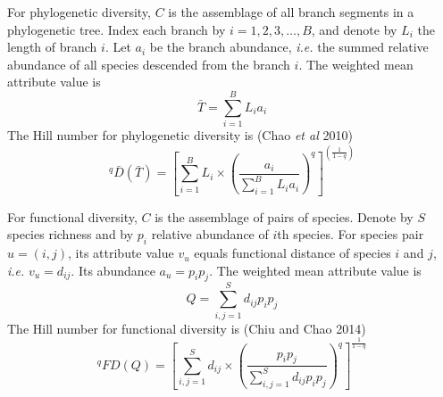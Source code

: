 \documentclass[11pt]{article}
\begin{document}
For phylogenetic diversity, $C$ is the assemblage of all branch segments in a phylogenetic tree. 
Index each branch by $i = 1,2,3,\dots,B$, and denote by $L_i$ the length of branch $i$. 
Let $a_i$ be the branch abundance, \textit{i.e.} the summed relative abundance of all species descended from the branch $i$. 
The weighted mean attribute value is 
\begin{equation}
    \bar{T} = \sum\limits_{i=1}^{B}L_ia_i
    \label{WeightedMeanAttributeValue_Phylogenetic}
\end{equation}
The Hill number for phylogenetic diversity is (Chao \textit{et al} 2010)
\begin{equation}
    ^{q}\bar{D}(\bar{T}) = [\sum\limits_{i=1}^{B}L_i \times (\frac{a_i}{\sum\limits_{i=1}^{B}L_ia_i})^q]^{(\frac{1}{1-q})}
    \label{HillNumber_Phylogenetic}
\end{equation}

\newline

For functional diversity, $C$ is the assemblage of pairs of species. 
Denote by $S$ species richness and by $p_i$ relative abundance of $i$th species. 
For species pair $u=(i,j)$, its attribute value $v_u$ equals functional distance of species $i$ and $j$, \textit{i.e.} $v_u = d_{ij}$. 
Its abundance $a_u = p_ip_j$. 
The weighted mean attribute value is 
\begin{equation}
    Q = \sum\limits_{i,j=1}^{S}d_{ij}p_ip_j
    \label{WeightedMeanAttributeValue_Functional}
\end{equation}
The Hill number for functional diversity is (Chiu and Chao 2014)
\begin{equation}
    ^{q}FD(Q) = [\sum\limits_{i,j=1}^{S}d_{ij} \times (\frac{p_ip_j}{\sum\limits_{i,j=1}^{S}d_{ij}p_ip_j})^q]^{\frac{1}{1-q}}
\end{equation}
\end{document}
